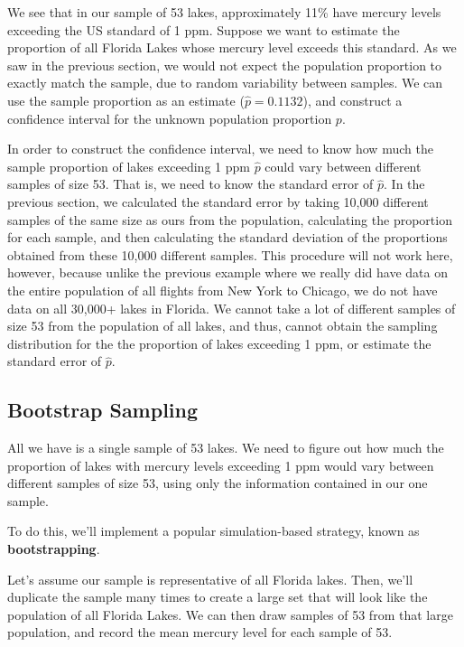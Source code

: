 \documentclass[
  letterpaper,
  DIV=11,
  numbers=noendperiod]{scrreprt}
\begin{document}
We see that in our sample of 53 lakes, approximately 11\% have mercury
levels exceeding the US standard of 1 ppm. Suppose we want to estimate
the proportion of all Florida Lakes whose mercury level exceeds this
standard. As we saw in the previous section, we would not expect the
population proportion to exactly match the sample, due to random
variability between samples. We can use the sample proportion as an
estimate (\(\hat{p} = 0.1132\)), and construct a confidence interval for
the unknown population proportion \(p\).

In order to construct the confidence interval, we need to know how much
the sample proportion of lakes exceeding 1 ppm \(\hat{p}\) could vary
between different samples of size 53. That is, we need to know the
standard error of \(\hat{p}\). In the previous section, we calculated
the standard error by taking 10,000 different samples of the same size
as ours from the population, calculating the proportion for each sample,
and then calculating the standard deviation of the proportions obtained
from these 10,000 different samples. This procedure will not work here,
however, because unlike the previous example where we really did have
data on the entire population of all flights from New York to Chicago,
we do not have data on all 30,000+ lakes in Florida. We cannot take a
lot of different samples of size 53 from the population of all lakes,
and thus, cannot obtain the sampling distribution for the the proportion
of lakes exceeding 1 ppm, or estimate the standard error of \(\hat{p}\).

\subsection{Bootstrap Sampling}\label{bootstrap-sampling}

All we have is a single sample of 53 lakes. We need to figure out how
much the proportion of lakes with mercury levels exceeding 1 ppm would
vary between different samples of size 53, using only the information
contained in our one sample.

To do this, we'll implement a popular simulation-based strategy, known
as \textbf{bootstrapping}.

Let's assume our sample is representative of all Florida lakes. Then,
we'll duplicate the sample many times to create a large set that will
look like the population of all Florida Lakes. We can then draw samples
of 53 from that large population, and record the mean mercury level for
each sample of 53.
\end{document}
